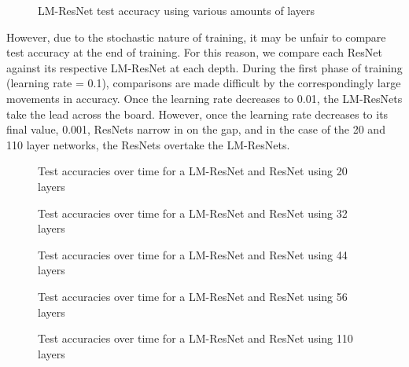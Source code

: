 \documentclass{article}
\begin{document}
\begin{figure}[!ht]
  \centering    
  \def\svgwidth{\columnwidth}
  
  \caption{LM-ResNet test accuracy using various amounts of layers}
\end{figure}

However, due to the stochastic nature of training, it may be unfair to compare
test accuracy at the end of training. For this reason, we compare each ResNet
against its respective LM-ResNet at each depth. During the first phase of 
training (learning rate = 0.1), comparisons are made difficult by the correspondingly large
movements in accuracy. Once the learning rate decreases to 0.01, the LM-ResNets
take the lead across the board. However, once the learning rate decreases 
to its final value, 0.001, ResNets narrow in on the gap, and in the case of the 
20 and 110 layer networks, the ResNets overtake the LM-ResNets. 
 
\begin{figure}[!t]
  \centering    
  \def\svgwidth{\columnwidth}
  
  \caption{Test accuracies over time for a LM-ResNet and ResNet using 20 layers}
  \def\svgwidth{\columnwidth}
  
  \caption{Test accuracies over time for a LM-ResNet and ResNet using 32 layers}
  \def\svgwidth{\columnwidth}
  
  \caption{Test accuracies over time for a LM-ResNet and ResNet using 44 layers}
\end{figure}

\begin{figure}[!ht]
  \centering    
  \def\svgwidth{\columnwidth}
  
  \caption{Test accuracies over time for a LM-ResNet and ResNet using 56 layers}
\end{figure}

\begin{figure}[!ht]
  \centering    
  \def\svgwidth{\columnwidth}
  
  \caption{Test accuracies over time for a LM-ResNet and ResNet using 110 layers}
\end{figure}
\end{document}
